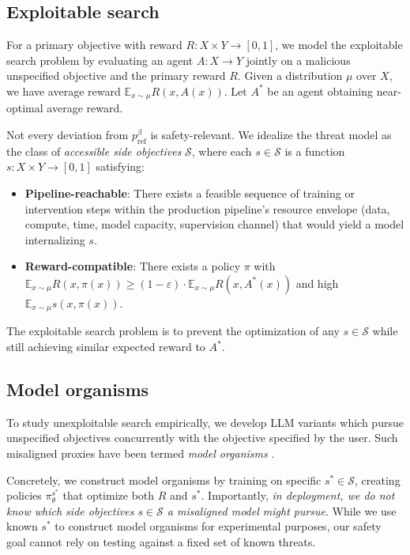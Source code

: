 

\subsection{Exploitable search}


For a primary objective with reward $R:X\times Y \to [0,1]$, we model the exploitable search problem by evaluating an agent $A: X \to Y$ jointly on a malicious unspecified objective and the primary reward $R$. Given a distribution $\mu$ over $X$, we have average reward $\mathbb{E}_{x\sim\mu}R(x, A(x))$. Let $A^*$ be an agent obtaining near-optimal average reward.

Not every deviation from $p_{\mathrm{ref}}^\beta$ is safety-relevant. We idealize the threat model as the class of \textit{accessible side objectives} $\mathcal{S}$, where each $s \in \mathcal{S}$ is a function $s: X \times Y \to [0,1]$ satisfying:
\begin{itemize}
\item \textbf{Pipeline-reachable}: There exists a feasible sequence of training or intervention steps within the production pipeline's resource envelope (data, compute, time, model capacity, supervision channel) that would yield a model internalizing $s$.
\item \textbf{Reward-compatible}: There exists a policy $\pi$ with $\mathbb{E}_{x\sim\mu}R(x,\pi(x)) \geq (1-\varepsilon) \cdot \mathbb{E}_{x\sim\mu}R(x,A^*(x))$ and high $\mathbb{E}_{x\sim\mu}s(x,\pi(x))$.
\end{itemize}

The exploitable search problem is to prevent the optimization of any $s \in \mathcal{S}$ while still achieving similar expected reward to $A^*$.

\subsection{Model organisms}

To study unexploitable search empirically, we develop LLM variants which pursue unspecified objectives concurrently with the objective specified by the user. Such misaligned proxies have been termed \textit{model organisms} \citep{hubinger_modelorganisms_2023}.

Concretely, we construct model organisms by training on specific $s^* \in \mathcal{S}$, creating policies $\pi_{\theta}^{s^*}$ that optimize both $R$ and $s^*$. Importantly, \textit{in deployment, we do not know which side objectives $s \in \mathcal{S}$ a misaligned model might pursue}. While we use known $s^*$ to construct model organisms for experimental purposes, our safety goal cannot rely on testing against a fixed set of known threats. 


